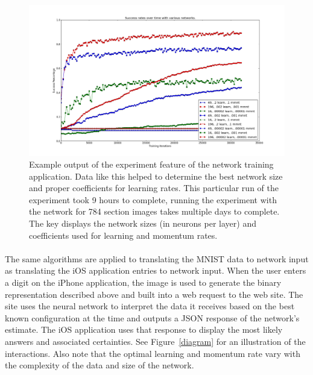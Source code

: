 \documentclass{article}
\begin{document}
    \begin{figure}
        \centering
        \includegraphics[scale=0.3]{images/experiment.png}
        \caption{Example output of the experiment feature of the network training
            application. Data like this helped to determine the best network 
            size and proper coefficients for learning rates. This particular run
            of the experiment took 9 hours to complete, running the experiment
            with the network for 784 section images takes multiple days to 
            complete. The key displays the network sizes (in neurons per layer) 
            and coefficients used for learning and momentum rates.}
        \label{experiment}
    \end{figure}

    \paragraph{}The same algorithms are applied to translating the MNIST data
    to network input as translating the iOS application entries to network input.
    When the user enters a digit on the iPhone application, the image is
    used to generate the binary representation described above and built into
    a web request to the web site. The site uses the neural network to interpret
    the data it receives based on the best known configuration at the time and
    outputs a JSON response of the network's estimate. The iOS application
    uses that response to display the most likely answers and associated
    certainties. See Figure~\ref{diagram} for an illustration of the interactions.
    Also note that the optimal learning and momentum rate vary
    with the complexity of the data and size of the network.
\end{document}
